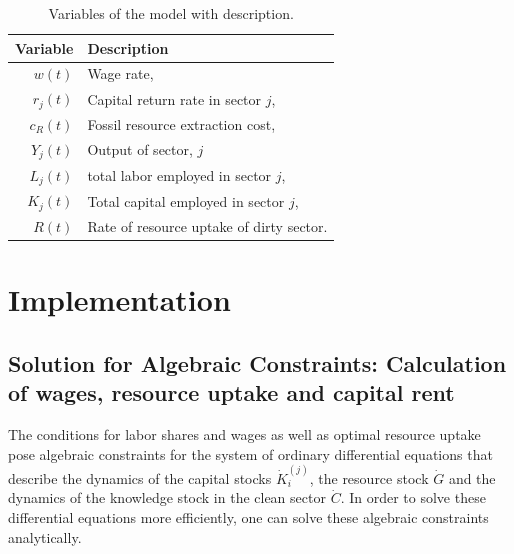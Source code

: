 \begin{table}[t]
	\centering
	\begin{tabular}{r|l}
		Variable & Description \\\hline
		$w(t)$   & Wage rate, \\
		$r_j(t)$ & Capital return rate in sector $j$, \\
		$c_R(t)$ & Fossil resource extraction cost, \\
		$Y_j(t)$ & Output of sector, $j$ \\
		$L_j(t)$ & total labor employed in sector $j$, \\
		$K_j(t)$ & Total capital employed in sector $j$, \\
		$R(t)$ & Rate of resource uptake of dirty sector. \\
	\end{tabular}
	\caption{Variables of the model with description.}
	\label{tab:derived_variables}
 \end{table}

 
  \section{Implementation} 



\subsection{Solution for Algebraic Constraints: Calculation of wages, resource uptake and capital rent}
\label{sec:algebraic_constraints}

The conditions for labor shares and wages as well as optimal resource uptake pose algebraic constraints for the system of ordinary differential equations that describe the dynamics of the capital stocks $\dot{K}_i^{(j)}$, the resource stock $\dot{G}$ and the dynamics of the knowledge stock in the clean sector $\dot{C}$. In order to solve these differential equations more efficiently, one can solve these algebraic constraints analytically.

